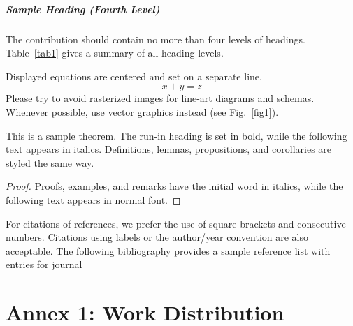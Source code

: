 \documentclass[runningheads]{llncs}
\begin{document}
\paragraph{Sample Heading (Fourth Level)}
The contribution should contain no more than four levels of
headings. Table~\ref{tab1} gives a summary of all heading levels.

\noindent Displayed equations are centered and set on a separate
line.
\begin{equation}
x + y = z
\end{equation}
Please try to avoid rasterized images for line-art diagrams and
schemas. Whenever possible, use vector graphics instead (see
Fig.~\ref{fig1}).

\begin{theorem}
This is a sample theorem. The run-in heading is set in bold, while
the following text appears in italics. Definitions, lemmas,
propositions, and corollaries are styled the same way.
\end{theorem}
%
%
\begin{proof}
Proofs, examples, and remarks have the initial word in italics,
while the following text appears in normal font.
\end{proof}
For citations of references, we prefer the use of square brackets
and consecutive numbers. Citations using labels or the author/year
convention are also acceptable. The following bibliography provides
a sample reference list with entries for journal
\cite{BFS}
%
%
%
% 
% 
%

 
 
\appendix
\chapter*{Annex 1: Work Distribution }
\end{document}
